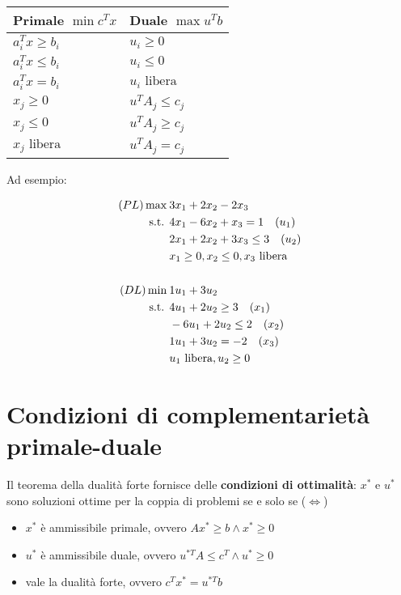 \begin{table}[htbp]
	\centering
	\begin{tabular}{|l|l|}
		\hline
		\multicolumn{1}{|r|}{\textbf{Primale} $\min c^T x$} & \textbf{Duale} $\max u^Tb$ \\ \hline
		$a_{i}^T x \geq b_i$    & $u_i \geq 0$    \\ \hline
		$a_{i}^T x \leq b_i$    & $u_i \leq 0$     \\ \hline
		$a_{i}^T x = b_i$       & $u_i \text{ libera}$     \\ \hline
		$x_j \geq 0$            & $u^TA_j \leq c_j$     \\ \hline
		$x_j \leq 0$            & $u^TA_j \geq c_j$       \\ \hline
		$x_j \text{ libera}$    & $u^TA_j = c_j$       \\ \hline
	\end{tabular}
\end{table}


\noindent Ad esempio:

\begin{align*}
(PL)\max\:& 3x_1 +2x_2 -2x_3 \\
     \text{s.t. }  & 4x_1 -6x_2 +x_3 = 1 \quad (u_1)\\
          & 2x_1 +2x_2 +3x_3 \leq 3 \quad (u_2) \\
          & x_1 \geq 0, x_2 \leq 0, x_3 \text{ libera} \\
          & \\
(DL)\min\:& 1u_1 + 3u_2 \\
	 \text{s.t. }  & 4u_1 +2u_2 \geq 3 \quad (x_1)\\
		  & -6u_1 +2u_2 \leq 2 \quad (x_2)\\
		  & 1 u_1 +3 u_2 = -2 \quad (x_3)\\
		  & u_1 \text{ libera}, u_2 \geq 0
\end{align*} 

\section{Condizioni di complementarietà primale-duale}

Il teorema della dualità forte fornisce delle \textbf{condizioni di ottimalità}: $x^*$ e $u^*$ sono soluzioni ottime per la coppia di problemi se e solo se ($\Leftrightarrow$)

\begin{itemize}
	\item $x^*$ è ammissibile primale, ovvero $Ax^* \geq b \wedge x^* \geq 0$
	\item $u^*$ è ammissibile duale, ovvero $u^{*T}A \leq c^T \wedge u^* \geq 0$
	\item vale la dualità forte, ovvero $c^Tx^* = u^{*T}b$
\end{itemize}

